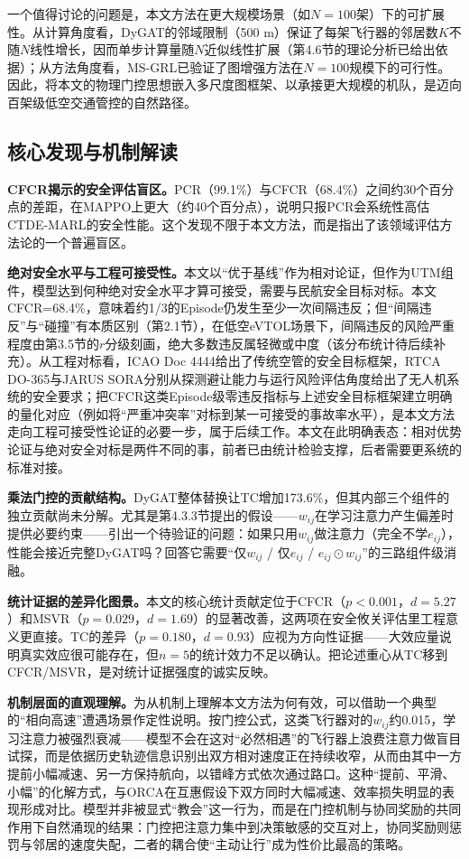 \documentclass[12pt,a4paper,UTF8]{ctexart}
\begin{document}
一个值得讨论的问题是，本文方法在更大规模场景（如$N=100$架）下的可扩展性。从计算角度看，DyGAT的邻域限制（500 m）保证了每架飞行器的邻居数$K$不随$N$线性增长，因而单步计算量随$N$近似线性扩展（第4.6节的理论分析已给出依据）；从方法角度看，MS-GRL已验证了图增强方法在$N=100$规模下的可行性。因此，将本文的物理门控思想嵌入多尺度图框架、以承接更大规模的机队，是迈向百架级低空交通管控的自然路径。

\subsection{核心发现与机制解读}

\textbf{CFCR揭示的安全评估盲区。}PCR（99.1\%）与CFCR（68.4\%）之间约30个百分点的差距，在MAPPO上更大（约40个百分点），说明只报PCR会系统性高估CTDE-MARL的安全性能。这个发现不限于本文方法，而是指出了该领域评估方法论的一个普遍盲区。

\textbf{绝对安全水平与工程可接受性。}本文以“优于基线”作为相对论证，但作为UTM组件，模型达到何种绝对安全水平才算可接受，需要与民航安全目标对标。本文CFCR=68.4\%，意味着约1/3的Episode仍发生至少一次间隔违反；但“间隔违反”与“碰撞”有本质区别（第2.1节），在低空eVTOL场景下，间隔违反的风险严重程度由第3.5节的$r$分级刻画，绝大多数违反属轻微或中度（该分布统计待后续补充）。从工程对标看，ICAO Doc 4444\cite{ref49}给出了传统空管的安全目标框架，RTCA DO-365\cite{ref51}与JARUS SORA\cite{ref50}分别从探测避让能力与运行风险评估角度给出了无人机系统的安全要求；把CFCR这类Episode级零违反指标与上述安全目标框架建立明确的量化对应（例如将“严重冲突率”对标到某一可接受的事故率水平），是本文方法走向工程可接受性论证的必要一步，属于后续工作。本文在此明确表态：相对优势论证与绝对安全对标是两件不同的事，前者已由统计检验支撑，后者需要更系统的标准对接。

\textbf{乘法门控的贡献结构。}DyGAT整体替换让TC增加173.6\%，但其内部三个组件的独立贡献尚未分解。尤其是第4.3.3节提出的假设——$w_{ij}$在学习注意力产生偏差时提供必要约束——引出一个待验证的问题：如果只用$w_{ij}$做注意力（完全不学$e_{ij}$），性能会接近完整DyGAT吗？回答它需要“仅$w_{ij}$ / 仅$e_{ij}$ / $e_{ij}\odot w_{ij}$”的三路组件级消融。

\textbf{统计证据的差异化图景。}本文的核心统计贡献定位于CFCR（$p<0.001$，$d=5.27$）和MSVR（$p=0.029$，$d=1.69$）的显著改善，这两项在安全攸关评估里工程意义更直接。TC的差异（$p=0.180$，$d=0.93$）应视为方向性证据——大效应量说明真实效应很可能存在，但$n=5$的统计效力不足以确认。把论述重心从TC移到CFCR/MSVR，是对统计证据强度的诚实反映。

\textbf{机制层面的直观理解。}为从机制上理解本文方法为何有效，可以借助一个典型的“相向高速”遭遇场景作定性说明。按门控公式，这类飞行器对的$w_{ij}$约0.015，学习注意力被强烈衰减——模型不会在这对“必然相遇”的飞行器上浪费注意力做盲目试探，而是依据历史轨迹信息识别出双方相对速度正在持续收窄，从而由其中一方提前小幅减速、另一方保持航向，以错峰方式依次通过路口。这种“提前、平滑、小幅”的化解方式，与ORCA在互惠假设下双方同时大幅减速、效率损失明显的表现形成对比。模型并非被显式“教会”这一行为，而是在门控机制与协同奖励的共同作用下自然涌现的结果：门控把注意力集中到决策敏感的交互对上，协同奖励则惩罚与邻居的速度失配，二者的耦合使“主动让行”成为性价比最高的策略。
\end{document}
